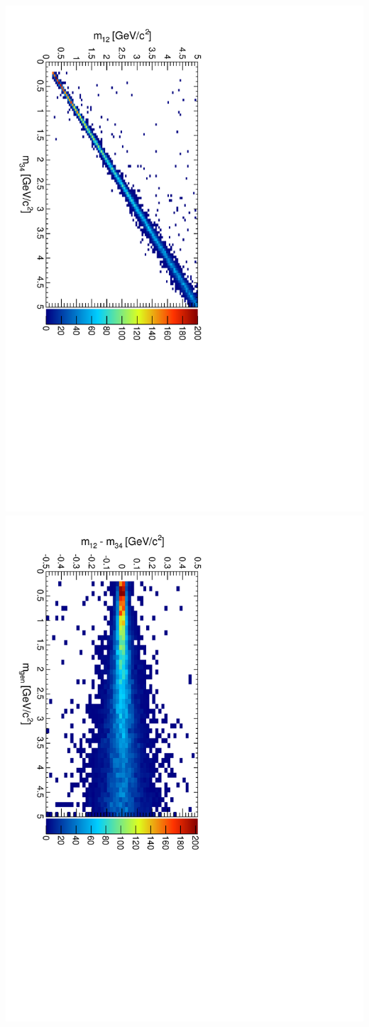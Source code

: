 \documentclass[compress]{beamer}
\begin{document}
\begin{frame}
\includegraphics[height=0.5\linewidth, angle=90]{m12m34.pdf}
\includegraphics[height=0.5\linewidth, angle=90]{mdiff_vs_mass.pdf}
\end{frame}
\end{document}
